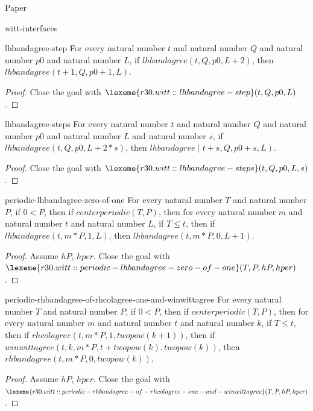 \begin{lexlean}{Paper}
\begin{section}{witt-interfaces}
  \begin{theorem}{lhbandagree-step}
  For every natural number \(t\) and natural number \(Q\) and natural number \(p0\) and natural number \(L\), if \(lhbandagree(t, Q, p0, L + 2)\), then \(lhbandagree(t + 1, Q, p0 + 1, L)\).
  \begin{proof}
  Close the goal with \(\lexeme{r30.witt::lhbandagree-step}(t, Q, p0, L)\).
  \end{proof}
  \end{theorem}

  \begin{theorem}{lhbandagree-steps}
  For every natural number \(t\) and natural number \(Q\) and natural number \(p0\) and natural number \(L\) and natural number \(s\), if \(lhbandagree(t, Q, p0, L + 2 * s)\), then \(lhbandagree(t + s, Q, p0 + s, L)\).
  \begin{proof}
  Close the goal with \(\lexeme{r30.witt::lhbandagree-steps}(t, Q, p0, L, s)\).
  \end{proof}
  \end{theorem}

  \begin{theorem}{periodic-lhbandagree-zero-of-one}
  For every natural number \(T\) and natural number \(P\), if \(0 < P\), then if \(centerperiodic(T, P)\), then for every natural number \(m\) and natural number \(t\) and natural number \(L\), if \(T ≤ t\), then if \(lhbandagree(t, m * P, 1, L)\), then \(lhbandagree(t, m * P, 0, L + 1)\).
  \begin{proof}
  Assume \(hP\), \(hper\).
  Close the goal with \(\lexeme{r30.witt::periodic-lhbandagree-zero-of-one}(T, P, hP, hper)\).
  \end{proof}
  \end{theorem}

  \begin{theorem}{periodic-rhbandagree-of-rhcolagree-one-and-winwittagree}
  For every natural number \(T\) and natural number \(P\), if \(0 < P\), then if \(centerperiodic(T, P)\), then for every natural number \(m\) and natural number \(t\) and natural number \(k\), if \(T ≤ t\), then if \(rhcolagree(t, m * P, 1, twopow(k + 1))\), then if \(winwittagree(t, k, m * P, t + twopow(k), twopow(k))\), then \(rhbandagree(t, m * P, 0, twopow(k))\).
  \begin{proof}
  Assume \(hP\), \(hper\).
  Close the goal with \(\lexeme{r30.witt::periodic-rhbandagree-of-rhcolagree-one-and-winwittagree}(T, P, hP, hper)\).
  \end{proof}
  \end{theorem}


\end{section}
\end{lexlean}
